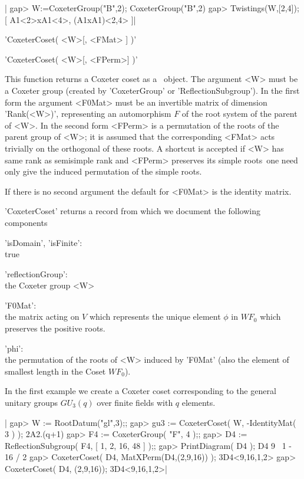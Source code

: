 |    gap> W:=CoxeterGroup("B",2);
    CoxeterGroup("B",2)
    gap> Twistings(W,[2,4]);
    [ A1<2>xA1<4>, (A1xA1)<2,4> ]|


'CoxeterCoset( <W>[, <FMat> ] )'

'CoxeterCoset( <W>[, <FPerm>] )'

This  function returns a Coxeter coset as  a \GAP\ object. The argument <W>
must be a Coxeter group (created by 'CoxeterGroup' or
'ReflectionSubgroup').  In the first  form the argument  <F0Mat> must be an
invertible  matrix of  dimension 'Rank(<W>)',  representing an automorphism
$F$  of the root system of the parent of <W>. In the second form <FPerm> is
a  permutation of the roots of the parent  group of <W>; it is assumed that
the corresponding <FMat> acts trivially on the orthogonal of these roots. A
shortcut  is accepted if <W>  has same rank as  semisimple rank and <FPerm>
preserves its simple roots\:\ one need only give the induced permutation of
the simple roots.

If  there is  no second  argument the  default for  <F0Mat> is the identity
matrix.

'CoxeterCoset' returns a record  from   which we document the   following
components\:

'isDomain', 'isFinite':\\
        true

'reflectionGroup':\\
        the Coxeter group <W>

'F0Mat':\\
        the matrix acting on $V$ which represents the unique element $\phi$
in $WF_0$ which preserves the positive roots.

'phi':\\
        the permutation of the roots of <W> induced by 'F0Mat'
        (also the element of smallest length in the Coset $WF_0$).

In  the  first example  we create a  Coxeter  coset corresponding  to the
general unitary groups $GU_3(q)$ over finite fields with $q$ elements.

|    gap> W := RootDatum("gl",3);;
    gap> gu3 := CoxeterCoset( W, -IdentityMat( 3 ) );
    2A2.(q+1)
    gap> F4 := CoxeterGroup( "F", 4 );;
    gap> D4 := ReflectionSubgroup( F4, [ 1, 2, 16, 48 ] );;
    gap> PrintDiagram( D4 );
    D4   9
          \
           1 - 16
          /
         2
    gap> CoxeterCoset( D4, MatXPerm(D4,(2,9,16)) );
    3D4<9,16,1,2>
    gap> CoxeterCoset( D4, (2,9,16));
    3D4<9,16,1,2>|

